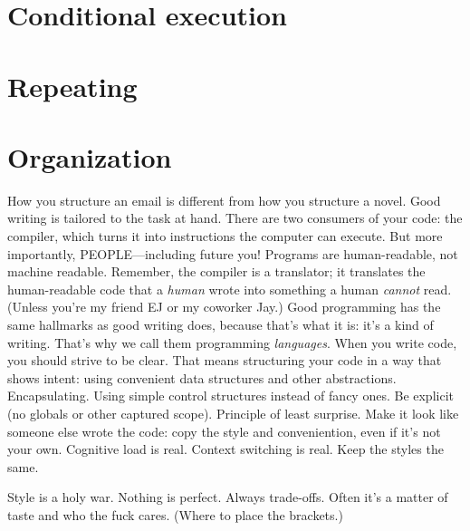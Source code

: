 \section{Conditional execution}
\section{Repeating}
\section{Organization}

How you structure an email is different from how you structure a novel. Good writing is tailored to the task at hand. There are two consumers of your code: the compiler, which turns it into instructions the computer can execute. But more importantly, PEOPLE---including future you! Programs are human-readable, not machine readable. Remember, the compiler is a translator; it translates the human-readable code that a \emph{human} wrote into something a human \emph{cannot} read. (Unless you're my friend EJ or my coworker Jay.) Good programming has the same hallmarks as good writing does, because that's what it is: it's a kind of writing. That's why we call them programming \emph{languages}. When you write code, you should strive to be clear. That means structuring your code in a way that shows intent: using convenient data structures and other abstractions. Encapsulating. Using simple control structures instead of fancy ones. Be explicit (no globals or other captured scope). Principle of least surprise. Make it look like someone else wrote the code: copy the style and conveniention, even if it's not your own. Cognitive load is real. Context switching is real. Keep the styles the same.

Style is a holy war. Nothing is perfect. Always trade-offs. Often it's a matter of taste and who the fuck cares. (Where to place the brackets.)

